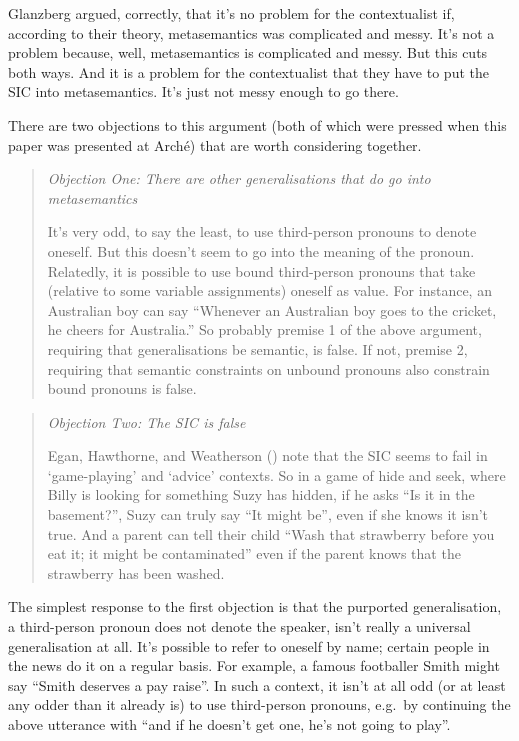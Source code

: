 \documentclass[
  10pt,
  letterpaper,
  DIV=11,
  numbers=noendperiod,
  twoside]{scrartcl}
\begin{document}
Glanzberg argued, correctly, that it's no problem for the contextualist
if, according to their theory, metasemantics was complicated and messy.
It's not a problem because, well, metasemantics is complicated and
messy. But this cuts both ways. And it is a problem for the
contextualist that they have to put the SIC into metasemantics. It's
just not messy enough to go there.

There are two objections to this argument (both of which were pressed
when this paper was presented at Arché) that are worth considering
together.

\begin{quote}
\emph{Objection One: There are other generalisations that do go into
metasemantics}

It's very odd, to say the least, to use third-person pronouns to denote
oneself. But this doesn't seem to go into the meaning of the pronoun.
Relatedly, it is possible to use bound third-person pronouns that take
(relative to some variable assignments) oneself as value. For instance,
an Australian boy can say ``Whenever an Australian boy goes to the
cricket, he cheers for Australia.'' So probably premise 1 of the above
argument, requiring that generalisations be semantic, is false. If not,
premise 2, requiring that semantic constraints on unbound pronouns also
constrain bound pronouns is false.
\end{quote}

\begin{quote}
\emph{Objection Two: The SIC is false}

Egan, Hawthorne, and Weatherson ()
note that the SIC seems to fail in `game-playing' and `advice' contexts.
So in a game of hide and seek, where Billy is looking for something Suzy
has hidden, if he asks ``Is it in the basement?'', Suzy can truly say
``It might be'', even if she knows it isn't true. And a parent can tell
their child ``Wash that strawberry before you eat it; it might be
contaminated'' even if the parent knows that the strawberry has been
washed.
\end{quote}

The simplest response to the first objection is that the purported
generalisation, a third-person pronoun does not denote the speaker,
isn't really a universal generalisation at all. It's possible to refer
to oneself by name; certain people in the news do it on a regular basis.
For example, a famous footballer Smith might say ``Smith deserves a pay
raise''. In such a context, it isn't at all odd (or at least any odder
than it already is) to use third-person pronouns, e.g.~by continuing the
above utterance with ``and if he doesn't get one, he's not going to
play''.
\end{document}
